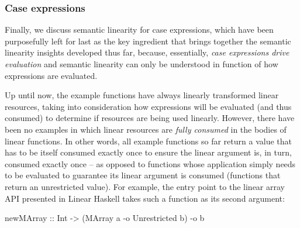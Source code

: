 \documentclass[acmsmall, screen, review]{acmart}
\begin{document}
\subsubsection{Case expressions}

Finally, we discuss semantic linearity for case expressions, which have been
purposefully left for last as the key ingredient that brings together the
semantic linearity insights developed thus far, because, essentially,
\emph{case expressions drive evaluation} and semantic linearity can only be
understood in function of how expressions are evaluated.

Up until now, the example functions have always linearly transformed linear
resources, taking into consideration how expressions will be evaluated (and thus
consumed) to determine if resources are being used linearly. However, there
have been no examples in which linear resources are \emph{fully consumed} in
the bodies of linear functions. In other words, all example functions so far
return a value that has to be itself consumed exactly once to ensure the linear
argument is, in turn, consumed exactly once -- as opposed to functions whose
application simply needs to be evaluated to guarantee its linear argument is
consumed (functions that return an unrestricted value).
%
%
For example, the entry point to the linear array API presented in Linear
Haskell takes such a function as its second argument:
\begin{working}
\begin{code}
newMArray :: Int -> (MArray a -o Unrestricted b) -o b
\end{code}
\end{working}

\end{document}
